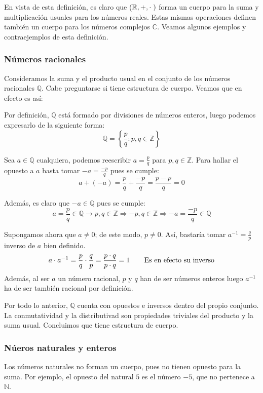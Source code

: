 \documentclass[12pt]{article}
\begin{document}
En vista de esta definición, es claro que ($\mathbb{R}, +, \cdot \hspace{1mm})$
forma un cuerpo para la suma y multiplicación usuales para los números reales.
Estas mismas operaciones definen también un cuerpo para los números complejos $\mathbb{C}$.
Veamos algunos ejemplos y contraejemplos de esta definición.


\subsubsection{Números racionales}
\hspace{3mm}
Consideramos la suma y el producto usual en el conjunto de los números racionales $\mathbb{Q}$.
Cabe preguntarse si tiene estructura de cuerpo. Veamos que en efecto es así:

\vspace{2mm}
Por definición, $\mathbb{Q}$ está formado por divisiones de números enteros, luego podemos expresarlo
de la siguiente forma:
$$\mathbb{Q} = \left\{\frac{p}{q} : p,q \in \mathbb{Z}\right\}$$

Sea $a \in \mathbb{Q}$ cualquiera, podemos reescribir $a = \frac{p}{q}$ para $p, q \in \mathbb{Z}$.
Para hallar el opuesto a $a$ basta tomar $-a = \frac{-p}{q}$ pues se cumple:
$$a + (-a) = \frac{p}{q} + \frac{-p}{q} = \frac{p-p}{q} = 0$$

Además, es claro que $-a \in \mathbb{Q}$ pues se cumple:
$$a = \frac{p}{q} \in \mathbb{Q} \rightarrow
 p,q \in \mathbb{Z} \Rightarrow -p,q \in \mathbb{Z}
 \Rightarrow -a = \frac{-p}{q} \in \mathbb{Q}$$

Supongamos ahora que $a \neq 0$; de este modo, $p \neq 0$.
Así, bastaría tomar $a^{-1} = \frac{q}{p}$ inverso de $a$ bien
definido.
$$ a \cdot a^{-1} = \frac{p}{q} \cdot \frac{q}{p}
 = \frac{p \cdot q}{p \cdot q} = 1 \hspace{6mm}
 \text{ Es en efecto su inverso}$$
Además, al ser $a$ un número racional, $p$ y $q$ han de ser números enteros
luego $a^{-1}$ ha de ser también racional por definición.

\vspace{2mm}
Por todo lo anterior, $\mathbb{Q}$ cuenta con opuestos e inversos dentro del propio
conjunto. La conmutatividad y la distributivad son propiedades triviales
del producto y la suma usual. Concluimos que tiene estructura de cuerpo.

\subsubsection{Núeros naturales y enteros}
\hspace{3mm}
Los números naturales no forman un cuerpo, pues no tienen opuesto para la suma.
Por ejemplo, el opuesto del natural $5$ es el número $-5$, que no pertenece
a $\mathbb{N}$.
\end{document}
